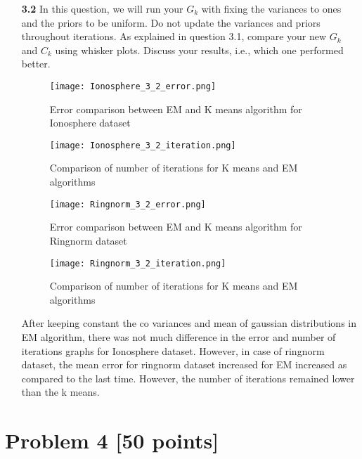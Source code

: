 \documentclass{article}
\begin{document}
\begin{enumerate}
  
  \item[\textbf{3.2}] In this question, we will run your $G_k$ with fixing the variances to ones and the priors to be uniform. Do not update the variances and priors throughout  iterations.  As explained in question 3.1,  compare  your new $G_k$  and $C_k$ using whisker plots. Discuss your results, i.e., which one performed better.
  
    \begin{figure}[H]
       \texttt{[image: Ionosphere\_3\_2\_error.png]}
       \caption{Error comparison between EM and K means algorithm for Ionosphere dataset}
      \end{figure}

      \begin{figure}[H]
        \texttt{[image: Ionosphere\_3\_2\_iteration.png]}
        \caption{Comparison of number of iterations for K means and EM algorithms}
      \end{figure}
    
    \begin{figure}[H]
      \texttt{[image: Ringnorm\_3\_2\_error.png]}
      \caption{Error comparison between EM and K means algorithm for Ringnorm dataset}
  	\end{figure}
    
    \begin{figure}[H]
      \texttt{[image: Ringnorm\_3\_2\_iteration.png]}
      \caption{Comparison of number of iterations for K means and EM algorithms}
  	\end{figure}
  
 After keeping constant the co variances and mean of gaussian distributions in EM algorithm, there was not much difference in the error and number of iterations graphs for Ionosphere dataset. 
 However, in case of ringnorm dataset, the mean error for ringnorm dataset increased for EM increased as compared to the last time. However, the number of iterations remained lower than the k means. 
  
\end{enumerate}
 
 



 
  \section*{Problem 4 [50 points]}  
  
\end{document}
